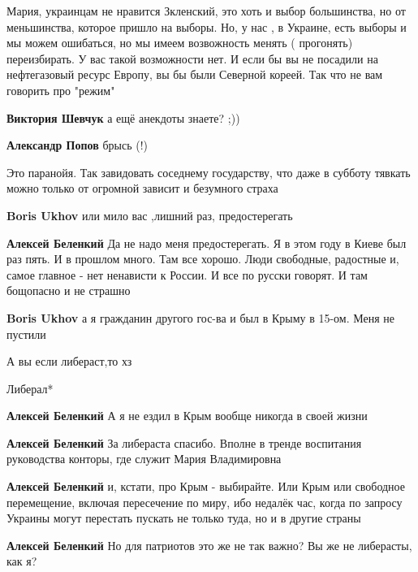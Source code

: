 \begin{itemize}
Мария, украинцам не нравится Зкленский, это хоть и выбор большинства, но от
меньшинства, которое пришло на выборы. Но, у нас , в Украине, есть выборы и мы
можем ошибаться, но мы имеем возвожность менять ( прогонять) переизбирать. У
вас такой возможности нет. И если бы вы не посадили на нефтегазовый ресурс
Европу, вы бы были Северной кореей. Так что не вам говорить про "режим"

\begin{itemize} %
\textbf{Виктория Шевчук} а ещё анекдоты знаете? ;))

\textbf{Александр Попов} брысь (!)
\end{itemize} %


Это паранойя. Так завидовать соседнему государству, что даже в субботу тявкать
можно только от огромной зависит и безумного страха

\begin{itemize} %
\textbf{Boris Ukhov} или мило вас ,лишний раз, предостерегать

\textbf{Алексей Беленкий} Да не надо меня предостерегать. Я в этом году в Киеве был раз пять. И в прошлом много. Там все хорошо.
Люди свободные, радостные и, самое главное - нет ненависти к России. И все по русски говорят. И там бощопасно и не страшно

\textbf{Boris Ukhov} а я гражданин другого гос-ва и был в Крыму в 15-ом. Меня не пустили

А вы если либераст,то хз

Либерал*

\textbf{Алексей Беленкий} А я не ездил в Крым вообще никогда в своей жизни

\textbf{Алексей Беленкий} За либераста спасибо. Вполне в тренде воспитания руководства конторы, где служит Мария Владимировна

\textbf{Алексей Беленкий} и, кстати, про Крым - выбирайте. Или Крым или свободное перемещение, включая пересечение по миру, ибо недалёк час, когда по запросу Украины могут перестать пускать не только туда, но и в другие страны

\textbf{Алексей Беленкий} Но для патриотов это же не так важно? Вы же не либерасты, как я?



\end{itemize}
\end{itemize}
